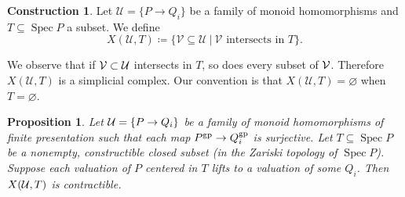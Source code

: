 \documentclass[10pt]{article}
\numberwithin{equation}{section}
\newtheorem{proposition}[paragraph]{Proposition}
\theoremstyle{definition}
\newtheorem{construction}[paragraph]{Construction}
\theoremstyle{remark}
\def\Spec{\operatorname{Spec}}
\def\spec{\Spec}
\newcommand{\gp}[1]{#1^{\rm gp}}
\begin{document}
\begin{construction} \label{const:1}
	Let $\mathcal U = \{ P \to Q_i \}$ be a family of monoid homomorphisms and $T \subseteq \spec P$ a subset.  We define 
	\begin{equation*}
		X( \mathcal U, T ) \coloneqq  \{ \mathcal V \subseteq \mathcal U \: \big| \: \text{$\mathcal V$ intersects in $T$} \}.
	\end{equation*}
\end{construction}

We observe that if $\mathcal V \subset \cal U$ intersects in $T$, so does every subset of $\cal V$.  Therefore $X( \mathcal U, T )$ is a simplicial complex.  Our convention is that $X(\mathcal U, T) = \varnothing$ when $T = \varnothing$.






\begin{proposition}\label{prop:contractible3}
	Let ${\cal U} = \{P \to Q_i\}$ be a family of monoid homomorphisms of finite presentation such that each map $\gp P \to \gp Q_i$ is surjective.  Let $T \subseteq \spec P$ be a nonempty, constructible closed subset (in the Zariski topology of $\spec P$).  Suppose each valuation of $P$ centered in $T$ lifts to a valuation of some $Q_i$. Then $X({\cal U}, T)$ is contractible. 
\end{proposition}
\end{document}
